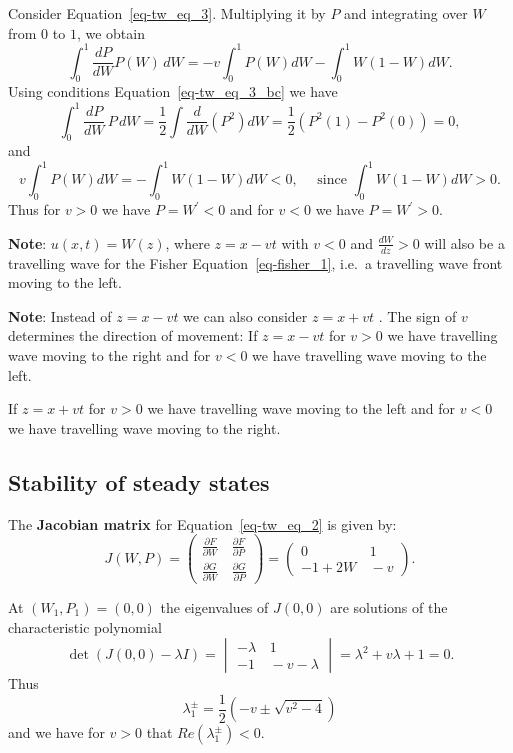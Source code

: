\documentclass[
  letterpaper,
  DIV=11,
  numbers=noendperiod]{scrreprt}
\theoremstyle{plain}
\theoremstyle{definition}
\theoremstyle{plain}
\theoremstyle{remark}
\begin{document}
Consider Equation~\ref{eq-tw_eq_3}. Multiplying it by \(P\) and
integrating over \(W\) from \(0\) to \(1\), we obtain \[
\int_0^1 \frac{dP}{dW}  P(W)\, dW = - v \int_0^1  P(W) dW - \int_0^1 W(1-W) dW.
\] Using conditions Equation~\ref{eq-tw_eq_3_bc} we have \[
\int_0^1 \frac{dP}{dW} \, P\, dW = \frac 12 \int  \frac{d}{dW} (P^2) dW = \frac 12\left( P^2(1) - P^2(0)\right) = 0,
\] and \[
  v \int_0^1  P(W) dW=  - \int_0^1 W(1-W) dW <0, \quad \text{ since } \int_0^1 W(1-W) dW >0. 
\] Thus for \(v>0\) we have \(P= W^\prime<0\) and for \(v<0\) we have
\(P= W^\prime>0\).

\textbf{Note}: \(u(x,t) = W(z)\), where \(z= x- vt\) with \(v<0\) and
\(\frac{ dW}{dz} >0\) will also be a travelling wave for the Fisher
Equation~\ref{eq-fisher_1}, i.e.~a travelling wave front moving to the
left.

\textbf{Note}: Instead of \(z = x - vt\) we can also consider
\(z=x+ vt\) . The sign of \(v\) determines the direction of movement: If
\(z = x - vt\) \quad for \(v>0\) we have travelling wave moving to the
right and for \(v<0\) we have travelling wave moving to the left.

If \(z = x + vt\) \quad for \(v>0\) we have travelling wave moving to
the left and for \(v<0\) we have travelling wave moving to the right.

\hypertarget{stability-of-steady-states}{%
\subsection{Stability of steady
states}\label{stability-of-steady-states}}

The \textbf{Jacobian matrix} for Equation~\ref{eq-tw_eq_2} is given by:
\[
J(W,P) = \begin{pmatrix}
\frac{\partial F}{\partial W} & \, \frac{\partial F }{\partial P}\\
\frac{\partial G }{\partial W} & \, \frac{\partial G }{\partial P}
\end{pmatrix}  =
\begin{pmatrix}
0 & \,  1\\
-1 + 2W & \, - v 
\end{pmatrix}.
\]

At \((W_1, P_1)=(0,0)\) the eigenvalues of \(J(0,0)\) are solutions of
the characteristic polynomial \[
\det(J(0,0) - \lambda I) = \begin{vmatrix} -\lambda & \, 1\\
- 1 & \, -v - \lambda
\end{vmatrix} = \lambda^2 + v \lambda + 1 = 0.
\] Thus \[
\lambda^{\pm}_1 = \frac 12 ( - v \pm \sqrt{ v^2 - 4})
\] and we have for \(v>0\) that \({R} e(\lambda_1^\pm) <0\).
\end{document}
